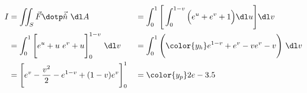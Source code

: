 \begin{enumerate}
          \begin{align}
              I              & = \iint_S \vec{F} \dotp \vec{\hat{n}}\ \dl A        &
                             & = \int_{0}^{1}
              \Bigg[\int_{0}^{1 - v} \Big( e^u + e^v + 1 \Big)
              \dl u \Bigg] \dl v                                                     \\
                             & = \int_{0}^{1}
              \Bigg[ e^u + u\ e^v + u \Bigg]_0^{1 - v}
              \ \dl v        &
                             & = \int_{0}^{1}
              \Bigg( {\color{y_h} e^{1-v} + e^v - ve^v - v} \Bigg)\ \dl v            \\
                             & = \Bigg[ e^v - \frac{v^2}{2} - e^{1-v} + (1 - v)e^v
              \Bigg]_{0}^{1} &
                             & = \color{y_p} 2e - 3.5
          \end{align}


\end{enumerate}
